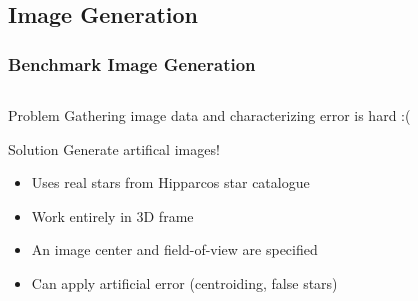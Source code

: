 \documentclass[11pt]{beamer}
\begin{document}
    \subsection{Image Generation}\label{subsec:imageGeneration}
    \begin{frame}
        \frametitle{Benchmark Image Generation}
        \begin{columns}
            \begin{column}{0.5\textwidth}
                \begin{block}{Problem}
                    Gathering image data and characterizing error is hard :(
                \end{block} \medskip
                \begin{block}{Solution}
                    Generate artifical images!
                    \begin{itemize}
                        \item Uses real stars from Hipparcos star catalogue
                        \item Work entirely in 3D frame
                        \item An image center and field-of-view are specified
                        \item Can apply artificial error (centroiding, false stars)
                    \end{itemize}
                \end{block}
            \end{column}
            \begin{column}{0.5\textwidth}
                \hspace*{-2pt}
            \end{column}
        \end{columns}

    \end{frame}
\end{document}
